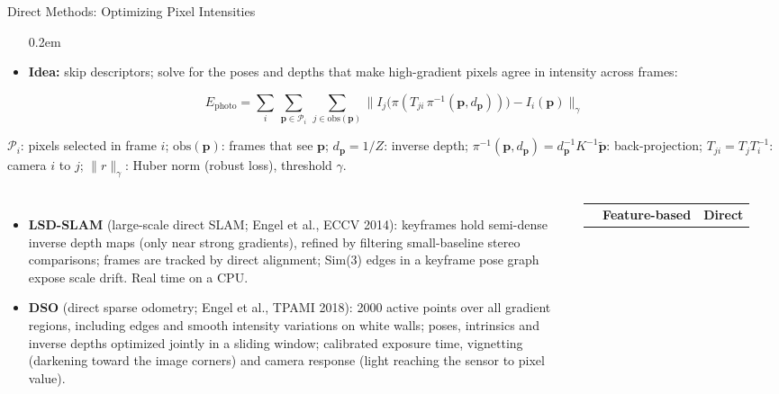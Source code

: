\begin{frame}{Direct Methods: Optimizing Pixel Intensities}
  \begin{itemize}\scriptsize\itemsep0.2em
    \item \textbf{Idea:} skip descriptors; solve for the poses and depths that make high-gradient pixels agree in intensity across frames:
  \end{itemize}
  \vspace{-0.6em}
  \[ E_{\text{photo}} = \sum_{i}\,\sum_{\mathbf{p}\in\mathcal{P}_i}\,\sum_{j\in\mathrm{obs}(\mathbf{p})} \Big\lVert I_j\big(\pi(T_{ji}\,\pi^{-1}(\mathbf{p},d_{\mathbf{p}}))\big) - I_i(\mathbf{p})\Big\rVert_\gamma \]
  {\scriptsize $\mathcal{P}_i$: pixels selected in frame $i$; $\mathrm{obs}(\mathbf{p})$: frames that see $\mathbf{p}$; $d_{\mathbf{p}}=1/Z$: inverse depth; $\pi^{-1}(\mathbf{p},d_{\mathbf{p}}) = d_{\mathbf{p}}^{-1}K^{-1}\tilde{\mathbf{p}}$: back-projection; $T_{ji}=T_jT_i^{-1}$: camera $i$ to $j$; $\lVert r\rVert_\gamma$: Huber norm (robust loss), threshold $\gamma$.\par}
  \vspace{0.2em}
  \begin{columns}[T,onlytextwidth]
      \begin{itemize}\scriptsize\itemsep0.2em
        \item \textbf{LSD-SLAM} (large-scale direct SLAM; Engel et al., ECCV 2014): keyframes hold semi-dense inverse depth maps (only near strong gradients), refined by filtering small-baseline stereo comparisons; frames are tracked by direct alignment; Sim(3) edges in a keyframe pose graph expose scale drift. Real time on a CPU.
        \item \textbf{DSO} (direct sparse odometry; Engel et al., TPAMI 2018): 2000 active points over all gradient regions, including edges and smooth intensity variations on white walls; poses, intrinsics and inverse depths optimized jointly in a sliding window; calibrated exposure time, vignetting (darkening toward the image corners) and camera response (light reaching the sensor to pixel value).
      \end{itemize}
      {\centering\scriptsize\setlength{\tabcolsep}{3pt}
      \begin{tabular}{>{\raggedright\arraybackslash}p{1.45cm} >{\raggedright\arraybackslash}p{2.5cm} >{\raggedright\arraybackslash}p{2.85cm}}
        \toprule
         & \textbf{Feature-based} & \textbf{Direct} \\

\end{tabular}}
\end{columns}
\end{frame}
